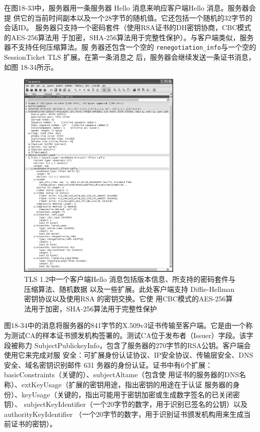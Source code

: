 在图18-33中，服务器用一条服务器 Hello 消息来响应客户端Hello 消息。服务器会提
供它的当前时间副本以及一个28字节的随机值。它还包括一个随机的32字节的会话ID。
服务器只支持一个密码套件（使用RSA证书的DH密钥协商，CBC模式的AES-256算法用
于加密，SHA-256算法用于完整性保护）。与客户端类似，服务器不支持任何压缩算法。服
务器还包含一个空的 \verb|renegotiation_info|与一个空的 SessionTicket TLS 扩展。在第一条消息之
后，服务器会继续发送一条证书消息，如图 18-34所示。
\begin{figure}[!htb]
    \centering
	\includegraphics[width=0.7\textwidth]{imgs/18/18-32.png}
	\caption{TLS 1.2中一个客户端Hello 消息包括版本信息、所支持的密码套件与压缩算法、随机数据
            以及一些扩展。此处客户端支持 Diffie-Hellman 密钥协议以及使用RSA 的密钥交换。它使
            用CBC模式的AES-256算法用于加密，SHA-256算法用于完整性保护}
\end{figure}

图18-34中的消息将服务器的841字节的X.509v3证书传输至客户端。它是由一个称
为测试CA的样本证书颁发机构签署的。测试CA位于发布者（Issuer）字段。该字段被称力
SubjectPublickeyInfo，包含了服务器的270字节的RSA公钥。客户端会使用它来完成对服
安全：可扩展身份认证协议、IP安全协议、传输层安全、DNS 安全、域名密钥识别邮件 631
务器的身份认证。证书中有6个扩展：basicConstraints（关键的）、subjectAltame（包含使
用证书的服务器的DNS名称）、extKeyUsage（扩展的密钥用途，指出密钥的用途在于认证
服务器的身份）、keyUsage（关键的，指出可能用于密钥加密或生成数字签名的已关闭密钥）、
subjectKeyIdentifier（一个20字节的数字，用于识别已签名的公钥）以及 authorityKeyIdentifier
（一个20字节的数字，用于识别证书颁发机构用来生成当前证书的密钥）。

